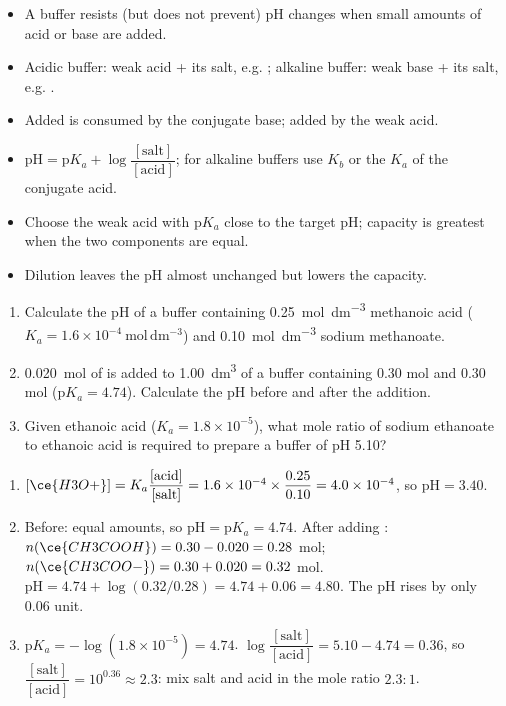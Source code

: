 \documentclass[11pt]{article}
\begin{document}
\begin{aretenir}
\begin{itemize}
\item A buffer resists (but does not prevent) pH changes when small amounts of acid or base are added.
\item Acidic buffer: weak acid + its salt, e.g. ; alkaline buffer: weak base + its salt, e.g. .
\item Added  is consumed by the conjugate base; added  by the weak acid.
\item $\mathrm{pH} = \mathrm{p}K_a + \log\dfrac{[\text{salt}]}{[\text{acid}]}$; for alkaline buffers use $K_b$ or the $K_a$ of the conjugate acid.
\item Choose the weak acid with $\mathrm{p}K_a$ close to the target pH; capacity is greatest when the two components are equal.
\item Dilution leaves the pH almost unchanged but lowers the capacity.
\end{itemize}
\end{aretenir}

\begin{exercice}
\begin{enumerate}
\item Calculate the pH of a buffer containing \SI{0.25}{mol.dm^{-3}} methanoic acid  ($K_a = 1.6\times10^{-4}\ \mathrm{mol\,dm^{-3}}$) and \SI{0.10}{mol.dm^{-3}} sodium methanoate.
\item \SI{0.020}{mol} of  is added to \SI{1.00}{dm^3} of a buffer containing 0.30 mol  and 0.30 mol  ($\mathrm{p}K_a = 4.74$). Calculate the pH before and after the addition.
\item Given ethanoic acid ($K_a = 1.8\times10^{-5}$), what mole ratio of sodium ethanoate to ethanoic acid is required to prepare a buffer of pH 5.10?
\end{enumerate}
\end{exercice}

\begin{corrige}[Exercise 1]
\begin{enumerate}
\item $[\ce{H3O+}] = K_a\dfrac{[\text{acid}]}{[\text{salt}]} = 1.6\times10^{-4}\times\dfrac{0.25}{0.10} = 4.0\times10^{-4}$, so $\mathrm{pH} = 3.40$.
\item Before: equal amounts, so $\mathrm{pH} = \mathrm{p}K_a = 4.74$. After adding : $n(\ce{CH3COOH}) = 0.30 - 0.020 = 0.28$ mol; $n(\ce{CH3COO-}) = 0.30 + 0.020 = 0.32$ mol. $\mathrm{pH} = 4.74 + \log(0.32/0.28) = 4.74 + 0.06 = 4.80$. The pH rises by only 0.06 unit.
\item $\mathrm{p}K_a = -\log(1.8\times10^{-5}) = 4.74$. $\log\dfrac{[\text{salt}]}{[\text{acid}]} = 5.10 - 4.74 = 0.36$, so $\dfrac{[\text{salt}]}{[\text{acid}]} = 10^{0.36} \approx 2.3$: mix salt and acid in the mole ratio $2.3 : 1$.
\end{enumerate}
\end{corrige}
\end{document}
